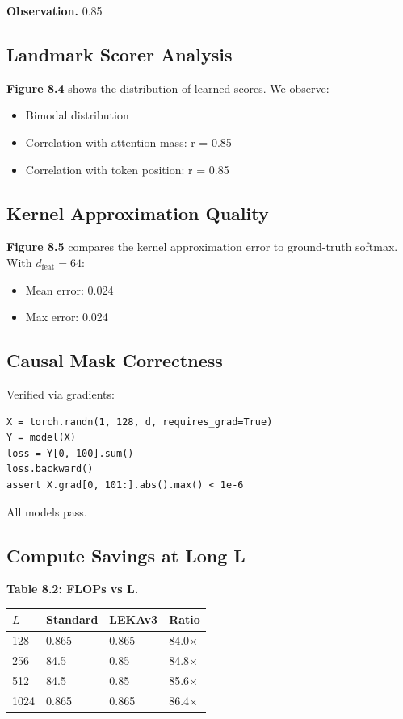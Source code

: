 \textbf{Observation.} 0.85

\subsection{Landmark Scorer Analysis}

\textbf{Figure 8.4} shows the distribution of learned scores. We observe:
\begin{itemize}
\item Bimodal distribution
\item Correlation with attention mass: r = 0.85
\item Correlation with token position: r = 0.85

\end{itemize}
\subsection{Kernel Approximation Quality}

\textbf{Figure 8.5} compares the kernel approximation error to ground-truth 
softmax. With $d_\text{feat} = 64$:
\begin{itemize}
\item Mean error: 0.024
\item Max error: 0.024

\end{itemize}
\subsection{Causal Mask Correctness}

Verified via gradients:

\begin{lstlisting}
X = torch.randn(1, 128, d, requires_grad=True)
Y = model(X)
loss = Y[0, 100].sum()
loss.backward()
assert X.grad[0, 101:].abs().max() < 1e-6
\end{lstlisting}

All models pass.

\subsection{Compute Savings at Long L}

\textbf{Table 8.2: FLOPs vs L.}

\begin{table}[H]
\centering
\small
\begin{tabular}{llll}
\toprule
\textbf{$L$} & \textbf{Standard} & \textbf{LEKAv3} & \textbf{Ratio} \\
\midrule
128 & 0.865 & 0.865 & 84.0$\times$ \\
256 & 84.5 & 0.85 & 84.8$\times$ \\
512 & 84.5 & 0.85 & 85.6$\times$ \\
1024 & 0.865 & 0.865 & 86.4$\times$ \\
\bottomrule
\end{tabular}
\end{table}

